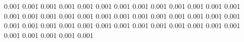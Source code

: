 0.001      0.001      %
0.001      0.001      %
0.001      0.001      %
0.001      0.001      %
0.001      0.001      %
0.001      0.001      %
0.001      0.001      %
0.001      0.001      %
0.001      0.001      %
0.001      0.001      %
0.001      0.001      %
0.001      0.001      %
0.001      0.001      %
0.001      0.001      %
0.001      0.001      %
0.001      0.001      %
0.001      0.001      %
0.001      0.001      %
0.001      0.001      %
0.001      0.001      %
0.001      0.001      %
0.001      0.001      %
